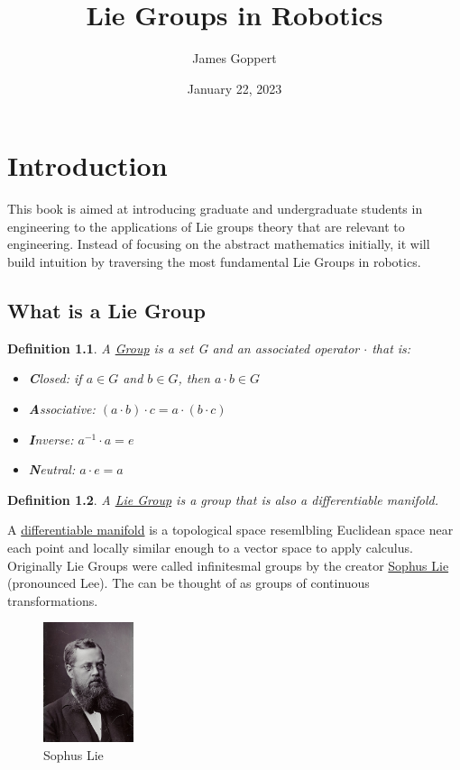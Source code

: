 \documentclass{book}
\title{Lie Groups in Robotics}
\author{James Goppert}
\date{January 22, 2023}
\newtheorem{definition}{Definition}
\begin{document}
\maketitle
\tableofcontents

\chapter{Introduction}

This book is aimed at introducing graduate and undergraduate students
in engineering to the applications of Lie groups theory that are 
relevant to engineering. Instead of focusing on the abstract 
mathematics initially, it will build intuition by traversing the most
fundamental Lie Groups in robotics.

\section{What is a Lie Group}

\begin{definition}
A \href{https://en.wikipedia.org/wiki/Group_(mathematics)}{Group} is a set G
and an associated operator $\cdot$ that is:
\begin{itemize}
    \item \textbf{C}losed: if $a \in G$ and $b \in G$, then $a \cdot b \in G$
	\item \textbf{A}ssociative: $(a \cdot b) \cdot c = a \cdot (b \cdot c)$
    \item \textbf{I}nverse: $a^{-1}\cdot a = e$
    \item \textbf{N}eutral: $a \cdot e = a$
\end{itemize}
\end{definition}

\begin{definition}
    A \href{https://en.wikipedia.org/wiki/Lie_group}{Lie Group} is a group that
    is also a differentiable manifold.
    \end{definition}

A \href{https://en.wikipedia.org/wiki/Differentiable_manifold}{differentiable manifold}
is a topological space resemlbling Euclidean space near each point
and locally similar enough to a vector space to apply calculus. Originally Lie Groups were called infinitesmal groups by the creator
\href{https://en.wikipedia.org/wiki/Sophus_Lie}{Sophus Lie} (pronounced Lee).
The can be thought of as groups of continuous transformations.

\begin{figure}[htp]
    \centering
    \includegraphics[width=100px]{sophus_lie}
    \caption{Sophus Lie}
\end{figure}
\end{document}
